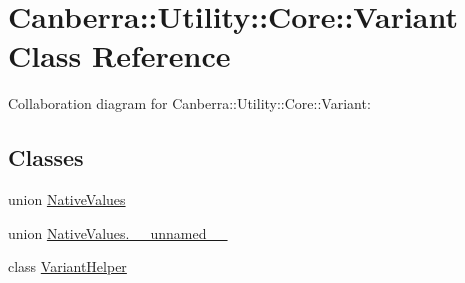 \hypertarget{class_canberra_1_1_utility_1_1_core_1_1_variant}{}\section{Canberra\+:\+:Utility\+:\+:Core\+:\+:Variant Class Reference}
\label{class_canberra_1_1_utility_1_1_core_1_1_variant}


Collaboration diagram for Canberra\+:\+:Utility\+:\+:Core\+:\+:Variant\+:
\subsection*{Classes}
\begin{DoxyCompactItemize}
\item 
union \hyperlink{class_canberra_1_1_utility_1_1_core_1_1_variant_de/db0/union_canberra_1_1_utility_1_1_core_1_1_variant_1_1_native_values}{Native\+Values}
\item 
union \hyperlink{class_canberra_1_1_utility_1_1_core_1_1_variant_d9/d8e/union_canberra_1_1_utility_1_1_core_1_1_variant_1_1_native_values_8____unnamed____}{Native\+Values.\+\_\+\+\_\+unnamed\+\_\+\+\_\+}
\item 
class \hyperlink{class_canberra_1_1_utility_1_1_core_1_1_variant_1_1_variant_helper}{Variant\+Helper}
\end{DoxyCompactItemize}
